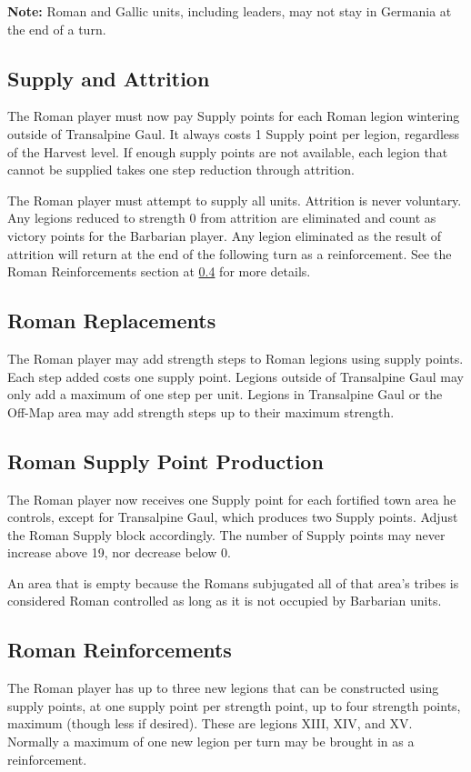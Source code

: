 \textbf{Note:} Roman and Gallic units, including leaders, may not stay in Germania at the end of a turn.

\subsection{Supply and Attrition}
\label{supply_and_attrition}
\par
The Roman player must now pay Supply points for each Roman legion wintering outside of Transalpine Gaul. It always costs 1 Supply point per legion, regardless of the Harvest level. If enough supply points are not available, each legion that cannot be supplied takes one step reduction through attrition.

The Roman player must attempt to supply all units. Attrition is never voluntary. Any legions reduced to strength 0 from attrition are eliminated and count as victory points for the Barbarian player. Any legion eliminated as the result of attrition will return at the end of the following turn as a reinforcement. See the Roman Reinforcements section at \ref{roman_reinforcements} for more details.

\subsection{Roman Replacements}
\par
The Roman player may add strength steps to Roman legions using supply points. Each step added costs one supply point. Legions outside of Transalpine Gaul may only add a maximum of one step per unit. Legions in Transalpine Gaul or the Off-Map area may add strength steps up to their maximum strength. 

\subsection{Roman Supply Point Production}
\par
The Roman player now receives one Supply point for each fortified town area he controls, except for Transalpine Gaul, which produces two Supply points. Adjust the Roman Supply block accordingly. The number of Supply points may never increase above 19, nor decrease below 0.

An area that is empty because the Romans subjugated all of that area's tribes is considered Roman controlled as long as it is not occupied by Barbarian units.

\subsection{Roman Reinforcements}\label{roman_reinforcements}
\par
The Roman player has up to three new legions that can be constructed using supply points, at one supply point per strength point, up to four strength points, maximum (though less if desired). These are legions XIII, XIV, and XV. Normally a maximum of one new legion per turn may be brought in as a reinforcement.

